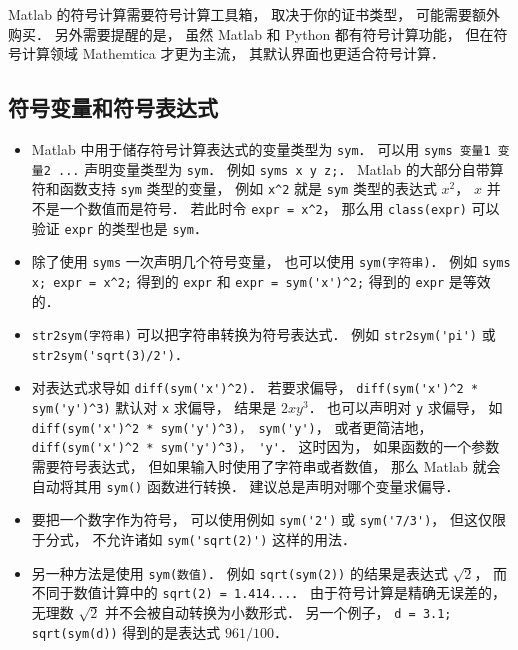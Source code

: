 

Matlab 的符号计算需要符号计算工具箱， 取决于你的证书类型， 可能需要额外购买． 另外需要提醒的是， 虽然 Matlab 和 Python 都有符号计算功能， 但在符号计算领域 Mathemtica 才更为主流， 其默认界面也更适合符号计算．

\subsection{符号变量和符号表达式}
\begin{itemize}
\item Matlab 中用于储存符号计算表达式的变量类型为 \verb|sym|． 可以用 \verb|syms 变量1 变量2 ...| 声明变量类型为 \verb|sym|． 例如 \verb|syms x y z;|． Matlab 的大部分自带算符和函数支持 \verb|sym| 类型的变量， 例如 \verb|x^2| 就是 \verb|sym| 类型的表达式 $x^2$， $x$ 并不是一个数值而是符号． 若此时令 \verb|expr = x^2|， 那么用 \verb|class(expr)| 可以验证 \verb|expr| 的类型也是 \verb|sym|．

\item 除了使用 \verb|syms| 一次声明几个符号变量， 也可以使用 \verb|sym(字符串)|． 例如 \verb|syms x; expr = x^2;| 得到的 \verb|expr| 和 \verb|expr = sym('x')^2;| 得到的 \verb|expr| 是等效的．

\item \verb|str2sym(字符串)| 可以把字符串转换为符号表达式． 例如 \verb|str2sym('pi')| 或 \verb|str2sym('sqrt(3)/2')|．

\item  对表达式求导如 \verb|diff(sym('x')^2)|． 若要求偏导， \verb|diff(sym('x')^2 * sym('y')^3)| 默认对 \verb|x| 求偏导， 结果是 $2x y^3$． 也可以声明对 \verb|y| 求偏导， 如 \verb|diff(sym('x')^2 * sym('y')^3)， sym('y')|， 或者更简洁地， \verb|diff(sym('x')^2 * sym('y')^3)， 'y'|． 这时因为， 如果函数的一个参数需要符号表达式， 但如果输入时使用了字符串或者数值， 那么 Matlab 就会自动将其用 \verb|sym()| 函数进行转换． 建议总是声明对哪个变量求偏导．

\item  要把一个数字作为符号， 可以使用例如 \verb|sym('2')| 或 \verb|sym('7/3')|， 但这仅限于分式， 不允许诸如 \verb|sym('sqrt(2)')| 这样的用法．

\item 另一种方法是使用 \verb|sym(数值)|． 例如 \verb|sqrt(sym(2))| 的结果是表达式 $\sqrt 2$， 而不同于数值计算中的 \verb|sqrt(2) = 1.414...|． 由于符号计算是精确无误差的， 无理数 $\sqrt{2}$ 并不会被自动转换为小数形式． 另一个例子， \verb|d = 3.1; sqrt(sym(d))| 得到的是表达式 $961/100$．


\end{itemize}
